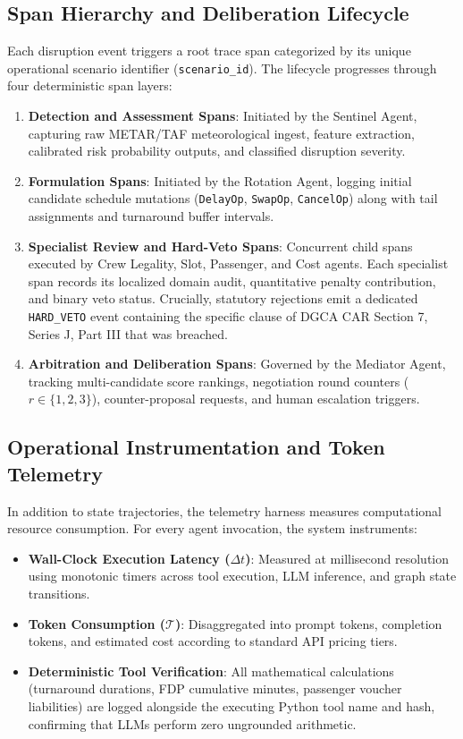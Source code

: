 \subsection{Span Hierarchy and Deliberation Lifecycle}
Each disruption event triggers a root trace span categorized by its unique operational scenario identifier (\texttt{scenario\_id}). The lifecycle progresses through four deterministic span layers:
\begin{enumerate}
    \item \textbf{Detection and Assessment Spans}: Initiated by the Sentinel Agent, capturing raw METAR/TAF meteorological ingest, feature extraction, calibrated risk probability outputs, and classified disruption severity.
    \item \textbf{Formulation Spans}: Initiated by the Rotation Agent, logging initial candidate schedule mutations (\texttt{DelayOp}, \texttt{SwapOp}, \texttt{CancelOp}) along with tail assignments and turnaround buffer intervals.
    \item \textbf{Specialist Review and Hard-Veto Spans}: Concurrent child spans executed by Crew Legality, Slot, Passenger, and Cost agents. Each specialist span records its localized domain audit, quantitative penalty contribution, and binary veto status. Crucially, statutory rejections emit a dedicated \texttt{HARD\_VETO} event containing the specific clause of DGCA CAR Section 7, Series J, Part III that was breached.
    \item \textbf{Arbitration and Deliberation Spans}: Governed by the Mediator Agent, tracking multi-candidate score rankings, negotiation round counters ($r \in \{1, 2, 3\}$), counter-proposal requests, and human escalation triggers.
\end{enumerate}

\subsection{Operational Instrumentation and Token Telemetry}
In addition to state trajectories, the telemetry harness measures computational resource consumption. For every agent invocation, the system instruments:
\begin{itemize}
    \item \textbf{Wall-Clock Execution Latency ($\Delta t$)}: Measured at millisecond resolution using monotonic timers across tool execution, LLM inference, and graph state transitions.
    \item \textbf{Token Consumption ($\mathcal{T}$)}: Disaggregated into prompt tokens, completion tokens, and estimated cost according to standard API pricing tiers.
    \item \textbf{Deterministic Tool Verification}: All mathematical calculations (turnaround durations, FDP cumulative minutes, passenger voucher liabilities) are logged alongside the executing Python tool name and hash, confirming that LLMs perform zero ungrounded arithmetic.
\end{itemize}

